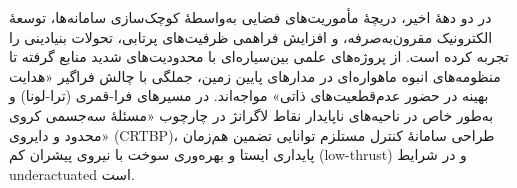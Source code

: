 %
%
%
%
%
%
%


در دو دههٔ اخیر، دریچهٔ مأموریت‌های فضایی به‌‌واسطهٔ کوچک‌سازی سامانه‌ها، توسعهٔ الکترونیک مقرون‌به‌صرفه، و افزایش فراهمی ظرفیت‌های پرتابی، تحولات بنیادینی را تجربه کرده است. از پروژه‌‌های علمی بین‌سیاره‌ای با محدودیت‌های شدید منابع گرفته تا منظومه‌های انبوه ماهواره‌ای در مدارهای پایین زمین، جملگی با چالش فراگیر «هدایت بهینه در حضور عدم‌قطعیت‌های ذاتی» مواجه‌اند. در مسیرهای فرا-قمری (ترا-لونا) و به‌طور خاص در ناحیه‌های ناپایدار نقاط لاگرانژ در چارچوب «مسئلهٔ سه‌جسمی کروی محدود و دایروی» (CRTBP)، طراحی سامانهٔ کنترل مستلزم توانایی تضمین هم‌زمان پایداری ایستا و بهره‌وری سوخت با نیروی پیشران کم (low-thrust) و در شرایط underactuated است.

